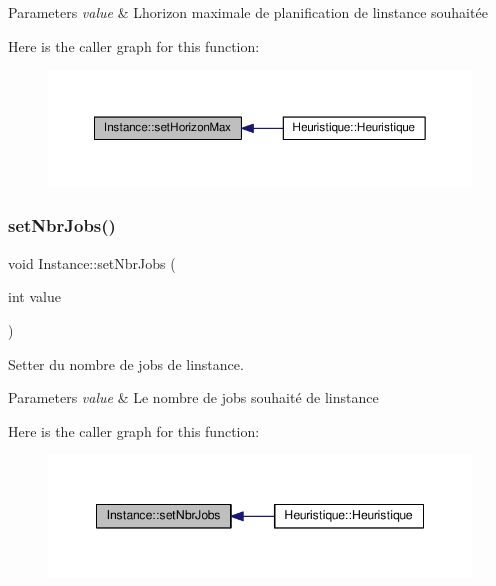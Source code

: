 \begin{DoxyParams}{Parameters}
{\em value} & L\textquotesingle{}horizon maximale de planification de l\textquotesingle{}instance souhaitée \\
\hline
\end{DoxyParams}
Here is the caller graph for this function\+:\nopagebreak
\begin{figure}[H]
\begin{center}
\leavevmode
\includegraphics[width=350pt]{classInstance_a048579344184b12873bf1d6bceb7ac9e_icgraph}
\end{center}
\end{figure}
\mbox{\label{classInstance_a0736cdee9e0838c995893b7ba8545c5d}} 
\subsubsection{\texorpdfstring{set\+Nbr\+Jobs()}{setNbrJobs()}}
{\footnotesize\ttfamily void Instance\+::set\+Nbr\+Jobs (\begin{DoxyParamCaption}\item[{int}]{value }\end{DoxyParamCaption})}



Setter du nombre de jobs de l\textquotesingle{}instance. 


\begin{DoxyParams}{Parameters}
{\em value} & Le nombre de jobs souhaité de l\textquotesingle{}instance \\
\hline
\end{DoxyParams}
Here is the caller graph for this function\+:\nopagebreak
\begin{figure}[H]
\begin{center}
\leavevmode
\includegraphics[width=348pt]{classInstance_a0736cdee9e0838c995893b7ba8545c5d_icgraph}
\end{center}
\end{figure}
\mbox{\label{classInstance_a6f61185f5b1136ba9ab2f6f01c9410b5}} 
